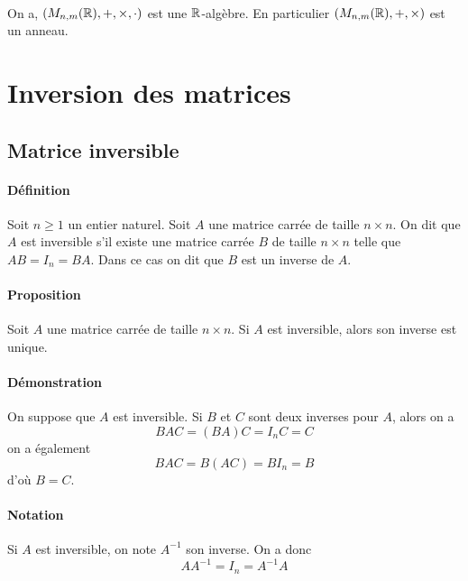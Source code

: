 \paragraph{} On a, $(M_{n, m}(\mathbb{R}), +, \times, \cdot)$ est une $\mathbb{R}$-algèbre. En particulier $(M_{n, m}(\mathbb{R}), +, \times)$ est un anneau.

%
%
\section{Inversion des matrices}
%
%

%
\subsection{Matrice inversible}
%
\paragraph{Définition} Soit $n \geq 1$ un entier naturel. Soit $A$ une matrice carrée de taille $n \times n$. On dit que $A$ est inversible s'il existe une matrice carrée $B$ de taille $n \times n$ telle que $A B = I_n = B A$. Dans ce cas on dit que $B$ est un inverse de $A$.

\paragraph{Proposition} Soit $A$ une matrice carrée de taille $n \times n$. Si $A$ est inversible, alors son inverse est unique.

\paragraph{Démonstration} On suppose que $A$ est inversible. Si $B$ et $C$ sont deux inverses pour $A$, alors on a
$$B A C = (B A) C = I_n C = C$$
on a également
$$B A C = B (A C) = B I_n = B$$
d'où $B = C$.

\paragraph{Notation} Si $A$ est inversible, on note $A^{-1}$ son inverse. On a donc
$$A A^{-1} = I_n = A^{-1} A$$

